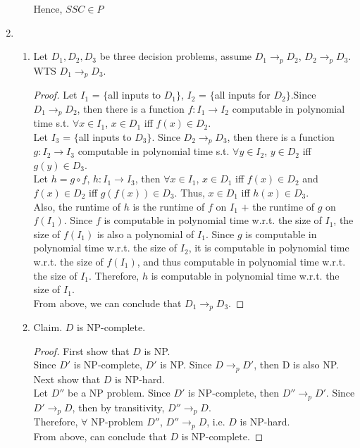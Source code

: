 \documentclass[11pt]{article}
\begin{document}
\begin{enumerate}
\begin{enumerate}
    Hence, $SSC\in P$\\
    
\end{enumerate}

\item
\begin{enumerate}
    \item Let $D_1, D_2, D_3$ be three decision problems, assume $D_1\rightarrow_p D_2$, $D_2\rightarrow_p D_3$. WTS $D_1\rightarrow_p D_3$.
    \begin{proof}
         Let $I_1$ = $\{$all inputs to $D_1\}$, $I_2$ = $\{$all inputs for $D_2\}$.Since $D_1\rightarrow_p D_2$, then there is a function $f: I_1\rightarrow I_2$ computable in polynomial time s.t. $\forall x \in I_1$, $x \in D_1$ iff $f(x) \in D_2$.\\
         Let $I_3$ = $\{$all inputs to $D_3\}$. Since $D_2\rightarrow_p D_3$, then there is a function $g: I_2\rightarrow I_3$ computable in polynomial time s.t. $\forall y \in I_2$, $y \in D_2$ iff $g(y) \in D_3$.\\
         Let $h = g \circ f$, $h: I_1 \rightarrow I_3$, then $\forall x \in I_1$, $x \in D_1$ iff $f(x) \in D_2$ and $f(x) \in D_2$ iff $g(f(x)) \in D_3$. Thus,  $x \in D_1 $ iff $h(x) \in D_3$.\\
         Also, the runtime of $h$ is the runtime of $f$ on $I_1$ $+$ the runtime of $g$ on $f(I_1)$. Since $f$ is computable in polynomial time w.r.t. the size of $I_1$, the size of $f(I_1)$ is also a polynomial of $I_1$. Since $g$ is computable in polynomial time w.r.t. the size of $I_2$, it is computable in polynomial time w.r.t. the size of $f(I_1)$, and thus computable in polynomial time w.r.t. the size of $I_1$. Therefore, $h$ is computable in polynomial time w.r.t. the size of $I_1$.\\
         From above, we can conclude that $D_1 \rightarrow_p D_3$. 
    \end{proof}
    \item Claim. $D$ is NP-complete.
    \begin{proof}
        First show that $D$ is NP.\\
        Since $D'$ is NP-complete, $D'$ is NP. Since $D \rightarrow_p D'$, then D is also NP.\\
        Next show that $D$ is NP-hard.\\
        Let $D''$ be a NP problem. Since $D'$ is NP-complete, then $D'' \rightarrow_p D'$. Since $D' \rightarrow_p D$, then by transitivity, $D'' \rightarrow_p D$.\\
        Therefore, $\forall$ NP-problem $D''$, $D'' \rightarrow_p D$, i.e. $D$ is NP-hard.\\
        From above, can conclude that $D$ is NP-complete.
    \end{proof}
    

\end{enumerate}
\end{enumerate}
\end{document}
